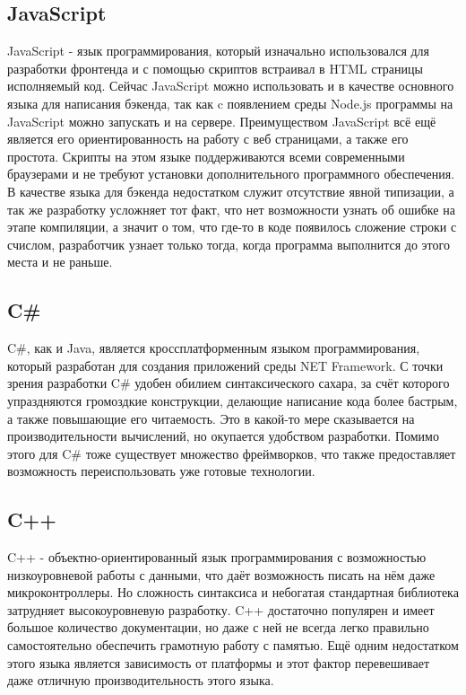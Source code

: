 \subsection{JavaScript}
JavaScript - язык программирования, который изначально использовался для разработки фронтенда и с помощью скриптов встраивал в HTML страницы исполняемый код. Сейчас JavaScript можно использовать и в качестве основного языка для написания бэкенда, так как c появлением среды Node.js программы на JavaScript можно запускать и на сервере. Преимуществом JavaScript всё ещё является его ориентированность на работу с веб страницами, а также его простота. Скрипты на этом языке поддерживаются всеми современными браузерами и не требуют установки дополнительного программного обеспечения. В качестве языка для бэкенда недостатком служит отсутствие явной типизации, а так же разработку усложняет тот факт, что нет возможности узнать об ошибке на этапе компиляции, а значит о том, что где-то в коде появилось сложение строки с счислом, разработчик узнает только тогда, когда программа выполнится до этого места и не раньше. 

\subsection{C\#}
C\#, как и Java, является кроссплатформенным языком программирования, который разработан для создания приложений среды NET Framework. С точки зрения разработки C\# удобен обилием синтаксического сахара, за счёт которого упраздняются громоздкие конструкции, делающие написание кода более бастрым, а также повышающие его читаемость. Это в какой-то мере сказывается на производительности вычислений, но окупается удобством разработки. Помимо этого для C\# тоже существует множество фреймворков, что также предоставляет возможность переиспользовать уже готовые технологии.

\subsection{C++}
C++ - объектно-ориентированный язык программирования с возможностью низкоуровневой работы с данными, что даёт возможность писать на нём даже микроконтроллеры. Но сложность синтаксиса и небогатая стандартная библиотека затрудняет высокоуровневую разработку. C++ достаточно популярен и имеет большое количество документации, но даже с ней не всегда легко правильно самостоятельно обеспечить грамотную работу с памятью. Ещё одним недостатком этого языка является зависимость от платформы и этот фактор перевешивает даже отличную производительность этого языка.

